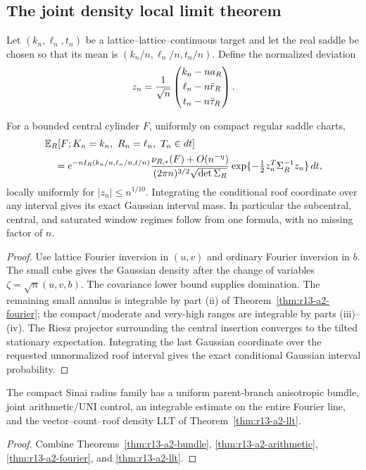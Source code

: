 \subsection{The joint density local limit theorem}

Let $(k_n,\ell_n,t_n)$ be a lattice--lattice--continuous target and let the
real saddle be chosen so that its mean is
$(k_n/n,\ell_n/n,t_n/n)$.  Define the normalized deviation
\[
 z_n={1\over\sqrt n}
 \begin{pmatrix}
 k_n-na_R\\[1mm]
 \ell_n-n\bar r_R\\[1mm]
 t_n-n\bar\tau_R
 \end{pmatrix}.
\]

\begin{theorem}
\label{thm:r13-a2-llt}
For a bounded central cylinder $F$, uniformly on compact regular saddle
charts,
\[
 \begin{aligned}
 &\mathbb E_R\!
 \left[F;K_n=k_n,\ R_n=\ell_n,\ T_n\in dt\right]\\
 &\quad=
 e^{-nI_R(k_n/n,\ell_n/n,t/n)}
 {\nu_{R,*}(F)+O(n^{-\eta})
  \over(2\pi n)^{3/2}\sqrt{\det\Sigma_R}}
 \exp\{-\tfrac12 z_n^T\Sigma_R^{-1}z_n\}\,dt,
 \end{aligned}
\]
locally uniformly for $|z_n|\le n^{1/10}$.  Integrating the conditional roof
coordinate over any interval gives its exact Gaussian interval mass.  In
particular the subcentral, central, and saturated window regimes follow from
one formula, with no missing factor of $n$.
\end{theorem}

\begin{proof}
Use lattice Fourier inversion in $(u,v)$ and ordinary Fourier inversion in
$b$.  The small cube gives the Gaussian density after the change of variables
$\zeta=\sqrt n(u,v,b)$.  The covariance lower bound supplies domination.  The
remaining small annulus is integrable by part (ii) of
Theorem~\ref{thm:r13-a2-fourier}; the compact/moderate and very-high ranges are
integrable by parts (iii)--(iv).  The Riesz projector surrounding the central
insertion converges to the tilted stationary expectation.  Integrating the
last Gaussian coordinate over the requested unnormalized roof interval gives
the exact conditional Gaussian interval probability.
\end{proof}

\begin{theorem}
\label{thm:r13-a2-main}
The compact Sinai radius family has a uniform parent-branch anisotropic
bundle, joint arithmetic/UNI control, an integrable estimate on the entire
Fourier line, and the vector--count--roof density LLT of
Theorem~\ref{thm:r13-a2-llt}.
\end{theorem}

\begin{proof}
Combine Theorems~\ref{thm:r13-a2-bundle},
\ref{thm:r13-a2-arithmetic}, \ref{thm:r13-a2-fourier}, and
\ref{thm:r13-a2-llt}.
\end{proof}
